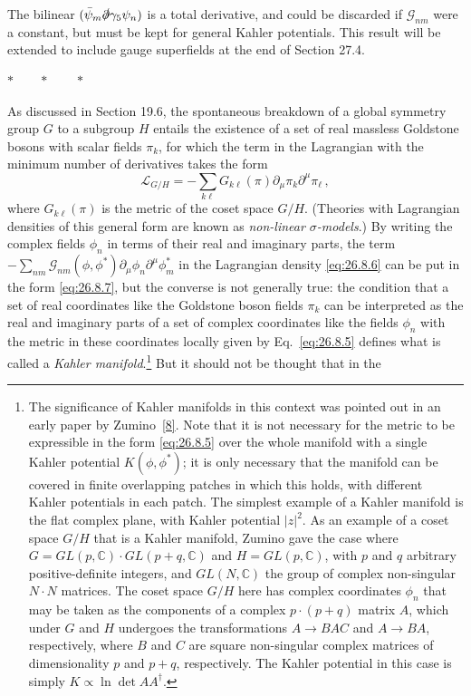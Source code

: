 The bilinear \((\bar\psi_m\sl{\partial}\gamma_5\psi_n)\) is a total
derivative, and could be discarded if \(\mathcal{G}_{nm}\) were a constant,
but must be kept for general Kahler potentials. This result will be extended
to include gauge superfields at the end of Section 27.4.

\begin{center}
\(\ast\qquad\ast\qquad\ast\)
\end{center}

As discussed in Section 19.6, the spontaneous breakdown of a global symmetry
group \(G\) to a subgroup \(H\) entails the existence of a set of real
massless Goldstone bosons with scalar fields \(\pi_k\), for which the term in
the Lagrangian with the minimum number of derivatives takes the form
\begin{equation}
  \mathcal{L}_{G/H}
  =-\sum_{k\ell}G_{k\ell}(\pi)
    \partial_\mu\pi_k\partial^\mu\pi_\ell\,,
  \tag{26.8.7}\label{eq:26.8.7}
\end{equation}
where \(G_{k\ell}(\pi)\) is the metric of the coset space \(G/H\). (Theories
with Lagrangian densities of this general form are known as
\textit{non-linear \(\sigma\)-models}.) By writing the complex fields
\(\phi_n\) in terms of their real and imaginary parts, the term
\(-\sum_{nm}\mathcal{G}_{nm}(\phi,\phi^*)
\partial_\mu\phi_n\partial^\mu\phi_m^*\) in the Lagrangian density
\eqref{eq:26.8.6} can be put in the form \eqref{eq:26.8.7}, but the converse
is not generally true: the condition that a set of real coordinates like the
Goldstone boson fields \(\pi_k\) can be interpreted as the real and imaginary
parts of a set of complex coordinates like the fields \(\phi_n\) with the
metric in these coordinates locally given by Eq.~\eqref{eq:26.8.5} defines
what is called a \textit{Kahler manifold}.\footnote{The significance of
Kahler manifolds in this context was pointed out in an early paper by
Zumino~\hyperref[ch26-ref-8]{[8]}. Note that it is not necessary for the
metric to be expressible in the form \eqref{eq:26.8.5} over the whole
manifold with a single Kahler potential \(K(\phi,\phi^*)\); it is only
necessary that the manifold can be covered in finite overlapping patches in
which this holds, with different Kahler potentials in each patch. The
simplest example of a Kahler manifold is the flat complex plane, with Kahler
potential \(\lvert z\rvert^2\). As an example of a coset space \(G/H\) that
is a Kahler manifold, Zumino gave the case where
\(G=GL(p,\mathbb{C})\cdot GL(p+q,\mathbb{C})\) and
\(H=GL(p,\mathbb{C})\), with \(p\) and \(q\) arbitrary positive-definite
integers, and \(GL(N,\mathbb{C})\) the group of complex non-singular
\(N\cdot N\) matrices. The coset space \(G/H\) here has complex coordinates
\(\phi_n\) that may be taken as the components of a complex
\(p\cdot(p+q)\) matrix \(A\), which under \(G\) and \(H\) undergoes the
transformations \(A\to BAC\) and \(A\to BA\), respectively, where \(B\) and
\(C\) are square non-singular complex matrices of dimensionality \(p\) and
\(p+q\), respectively. The Kahler potential in this case is simply
\(K\propto\ln\det AA^\dagger\).} But it should not be thought that in the
